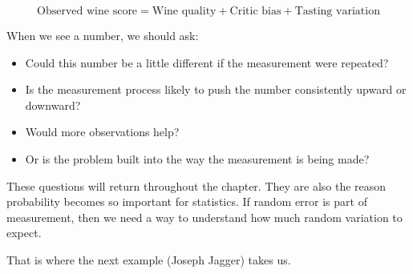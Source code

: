 \documentclass[
  letterpaper,
  DIV=11,
  numbers=noendperiod]{scrreprt}
\providecommand{\tightlist}{%
  \setlength{\itemsep}{0pt}\setlength{\parskip}{0pt}}
\begin{document}
\[
\text{Observed wine score} =
\text{Wine quality}
+
\text{Critic bias}
+
\text{Tasting variation}
\]

When we see a number, we should ask:

\begin{itemize}
\tightlist
\item
  Could this number be a little different if the measurement were
  repeated?
\item
  Is the measurement process likely to push the number consistently
  upward or downward?
\item
  Would more observations help?
\item
  Or is the problem built into the way the measurement is being made?
\end{itemize}

These questions will return throughout the chapter. They are also the
reason probability becomes so important for statistics. If random error
is part of measurement, then we need a way to understand how much random
variation to expect.

That is where the next example (Joseph Jagger) takes us.
\end{document}
